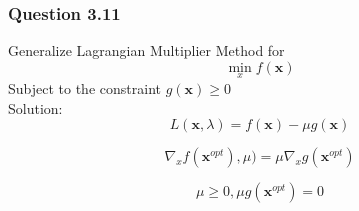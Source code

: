 \documentclass{beamer}
\begin{document}
\begin{frame}
\frametitle{Question 3.11}
Generalize Lagrangian Multiplier Method for
\begin{equation*}
    \min_{x} f(\textbf{x})
\end{equation*}
Subject to the constraint $ g( \textbf{x} ) \geq 0 $\\
Solution:\\
\begin{equation*}
   L(\textbf{x},\lambda)=f(\textbf{x})-\mu g(\textbf{x})
\end{equation*}

\begin{equation*}
   \nabla_{x} f( \textbf{x}^{opt}) , \mu )=\mu \nabla_{x} g(\textbf{x}^{opt})
\end{equation*}

\begin{equation*}
    \mu \geq 0, \mu g(\textbf{x}^{opt})=0
\end{equation*}
  






\end{frame}
\end{document}
